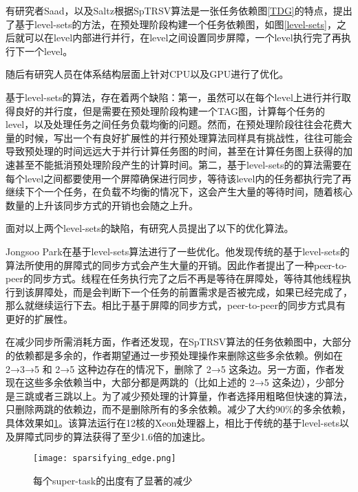 有研究者Saad\cite{anderson1989solving}，以及Saltz\cite{saltz1990aggregation}根据SpTRSV算法是一张任务依赖图\ref{TDG}的特点，提出了基于level-sets的方法，在预处理阶段构建一个任务依赖图，如图\ref{level-sets}，之后就可以在level内部进行并行，在level之间设置同步屏障，一个level执行完了再执行下一个level。

随后有研究人员在体系结构层面上针对CPU\cite{kabir2015sts}\cite{park2014sparsifying}\cite{Schreiber1982}\cite{wolf2010factors}以及GPU\cite{li2013gpu}\cite{naumov2011parallel}\cite{suchoski2012adapting}进行了优化。

基于level-sets的算法，存在着两个缺陷：第一，虽然可以在每个level上进行并行取得良好的并行度，但是需要在预处理阶段构建一个TAG图，计算每个任务的level，以及处理任务之间任务负载均衡的问题。然而，在预处理阶段往往会花费大量的时候，写出一个有良好扩展性的并行预处理算法同样具有挑战性，往往可能会导致预处理的时间远远大于并行计算任务图的时间，甚至在计算任务图上获得的加速甚至不能抵消预处理阶段产生的计算时间。第二，基于level-sets的的算法需要在每个level之间都要使用一个屏障确保进行同步，等待该level内的任务都执行完了再继续下个一个任务，在负载不均衡的情况下，这会产生大量的等待时间，随着核心数量的上升该同步方式的开销也会随之上升。

面对以上两个level-sets的缺陷，有研究人员提出了以下的优化算法。

Jongsoo Park\cite{park2014sparsifying}在基于level-sets算法进行了一些优化。他发现传统的基于level-sets的算法所使用的屏障式的同步方式会产生大量的开销。因此作者提出了一种peer-to-peer的同步方式。线程在任务执行完了之后不再是等待在屏障处，等待其他线程执行到该屏障处，而是会判断下一个任务的前置需求是否被完成，如果已经完成了，那么就继续运行下去。相比于基于屏障的同步方式，peer-to-peer的同步方式具有更好的扩展性。

在减少同步所需消耗方面，作者还发现，在SpTRSV算法的任务依赖图中，大部分的依赖都是多余的，作者期望通过一步预处理操作来删除这些多余依赖。例如在 2→3→5 和 2→5 这种边存在的情况下，删除了 2→5 这条边。另一方面，作者发现在这些多余依赖当中，大部分都是两跳的（比如上述的 2→5 这条边），少部分是三跳或者三跳以上。为了减少预处理的计算量，作者选择用粗略但快速的算法，只删除两跳的依赖边，而不是删除所有的多余依赖。减少了大约90\%的多余依赖，具体效果如\ref{sparsifying_edge}。该算法运行在12核的Xeon处理器上，相比于传统的基于level-sets以及屏障式同步的算法获得了至少1.6倍的加速比。

\begin{figure}[htbp]
    \centering
    \texttt{[image: sparsifying\_edge.png]}
    \caption{每个super-task的出度有了显著的减少}
    \label{sparsifying_edge}
\end{figure}

